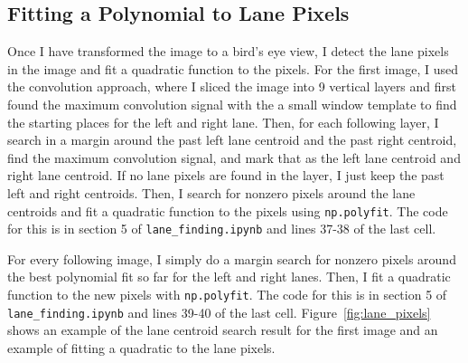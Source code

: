 \documentclass[12pt]{article}
\begin{document}
\subsection{Fitting a Polynomial to Lane Pixels}
Once I have transformed the image to a bird's eye view, I detect the lane pixels in the image and fit a quadratic function to the pixels. For the first image, I used the convolution approach, where I sliced the image into 9 vertical layers and first found the maximum convolution signal with the a small window template to find the starting places for the left and right lane. Then, for each following layer, I search in a margin around the past left lane centroid and the past right centroid, find the maximum convolution signal, and mark that as the left lane centroid and right lane centroid. If no lane pixels are found in the layer, I just keep the past left and right centroids. Then, I search for nonzero pixels around the lane centroids and fit a quadratic function to the pixels using \texttt{np.polyfit}. The code for this is in section 5 of \texttt{lane\_finding.ipynb} and lines 37-38 of the last cell.

For every following image, I simply do a margin search for nonzero pixels around the best polynomial fit so far for the left and right lanes. Then, I fit a quadratic function to the new pixels with \texttt{np.polyfit}. The code for this is in section 5 of \texttt{lane\_finding.ipynb} and lines 39-40 of the last cell. Figure~\ref{fig:lane_pixels} shows an example of the lane centroid search result for the first image and an example of fitting a quadratic to the lane pixels.
\end{document}
